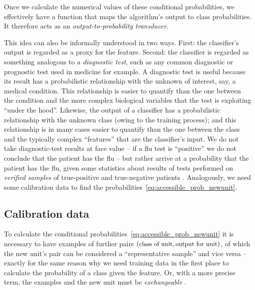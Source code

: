 \documentclass[a4paper,12pt,%
onecolumn,oneside,article,%
british%
]{memoir}
\renewcommand*{\|}[1][]{\nonscript\:#1\vert\nonscript\:\mathopen{}}
\newcommand*{\chap}{ch.}%
\newcommand*{\texts}[1]{\text{\small #1}}
\begin{document}
Once we calculate the numerical values of these conditional probabilities, we effectively have a function that maps the algorithm's output to class probabilities. It therefore acts as an \emph{output-to-probability transducer}.

This idea can also be informally understood in two ways. First: the classifier's output is regarded as a proxy for the feature. Second: the classifier is regarded as something analogous to a \emph{diagnostic test}, such as any common diagnostic or prognostic test used in medicine for example. A diagnostic test is useful because its result has a probabilistic relationship with the unknown of interest, say, a medical condition. This relationship is easier to quantify than the one between the condition and the more complex biological variables that the test is exploiting \enquote{under the hood}. Likewise, the output of a classifier has a probabilistic relationship with the unknown class (owing to the training process); and this relationship is in many cases easier to quantify than the one between the class and the typically complex \enquote{features} that are the classifier's input. We do not take diagnostic-test results at face value -- if a flu test is \enquote{positive} we do not conclude that the patient has the flu -- but rather arrive at a probability that the patient has the flu, given some statistics about results of tests performed on \emph{verified samples} of true-positive and true-negative patients \autocites[\chap~5]{soxetal1988_r2013}[\chap~5]{huninketal2001_r2014}[see also][]{jennyetal2018}. Analogously, we need some calibration data to find the probabilities~\eqref{eq:accessible_prob_newunit}.


\subsection{Calibration data}
\label{sec:calibration_data}

To calculate the conditional probabilities~\eqref{eq:accessible_prob_newunit} it is necessary to have examples of further pairs $(\texts{class of unit}, \texts{output for unit})$, of which the new unit's pair can be considered a \enquote{representative sample} \autocites[for a critical analysis of the sometimes hollow term \enquote{representative sample} see][]{kruskaletal1979,kruskaletal1980} and vice versa -- exactly for the same reason why we need training data in the first place to calculate the probability of a class given the feature. Or, with a more precise term, the examples and the new unit must be \emph{exchangeable} \autocites{lindleyetal1981}.
\end{document}
